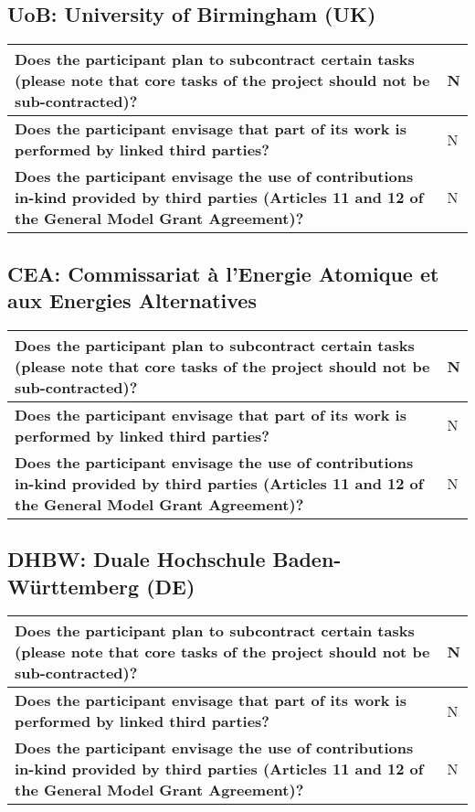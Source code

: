 \subsection*{UoB: University of Birmingham (UK)}

\begin{longtable}{|p{}|p{}|}
\hline
{\bf Does the participant plan to subcontract certain tasks (please
  note that core tasks of the project should not be sub-contracted)?}
&
N
\\
\hline
{\bf Does the participant envisage that  part of its work is performed
  by linked third parties?}
&
N
\\
\hline
{\bf Does the participant envisage the use of contributions in-kind
provided by third parties (Articles 11 and 12 of the General Model
Grant Agreement)?}
&
N
\\
\hline
\end{longtable}


\subsection*{CEA: Commissariat à l’Energie Atomique et aux Energies
  Alternatives}
\begin{longtable}{|p{}|p{}|}
\hline
{\bf Does the participant plan to subcontract certain tasks (please
  note that core tasks of the project should not be sub-contracted)?}
&
N
\\
\hline
{\bf Does the participant envisage that  part of its work is performed
  by linked third parties?}
&
N
\\
\hline
{\bf Does the participant envisage the use of contributions in-kind
provided by third parties (Articles 11 and 12 of the General Model
Grant Agreement)?}
&
N
\\
\hline
\end{longtable}



\subsection*{DHBW: Duale Hochschule Baden-Württemberg (DE)}

\begin{longtable}{|p{}|p{}|}
\hline
{\bf Does the participant plan to subcontract certain tasks (please
  note that core tasks of the project should not be sub-contracted)?}
&
N
\\
\hline
{\bf Does the participant envisage that  part of its work is performed
  by linked third parties?}
&
N
\\
\hline
{\bf Does the participant envisage the use of contributions in-kind
provided by third parties (Articles 11 and 12 of the General Model
Grant Agreement)?}
&
N
\\
\hline
\end{longtable}


